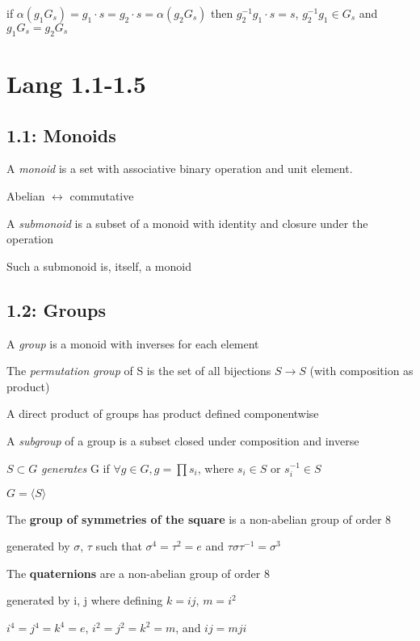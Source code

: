 \documentclass[12pt]{article}
\begin{document}
if $\alpha(g_1G_s) = g_1 \cdot s = g_2 \cdot s = \alpha(g_2G_s)$
then $g_2^{-1}g_1 \cdot s = s$, $g_2^{-1}g_1 \in G_s$ and $g_1G_s = g_2G_s$

\section{Lang 1.1-1.5}

\subsection{1.1: Monoids}

\noindent
A \textit{monoid} is a set with associative binary operation and unit element.

Abelian $\leftrightarrow$ commutative

\noindent
A \textit{submonoid} is a subset of a monoid with identity and closure under the operation

Such a submonoid is, itself, a monoid

\subsection{1.2: Groups}

\noindent
A \textit{group} is a monoid with inverses for each element

\noindent
The \textit{permutation group} of S is the set of all bijections $S \to S$ (with composition as product)

\noindent
A direct product of groups has product defined componentwise

\noindent
A \textit{subgroup} of a group is a subset closed under composition and inverse

\noindent
$S \subset G$ \textit{generates} G if $\forall g \in G, g = \prod s_i$, where $s_i \in S$ or $s_i^{-1} \in S$

$G = \langle S \rangle$

\noindent
The \textbf{group of symmetries of the square} is a non-abelian group of order 8

generated by $\sigma$, $\tau$ such that $\sigma^4 = \tau^2 = e$ and $\tau \sigma \tau^{-1} = \sigma^3$

\noindent
The \textbf{quaternions} are a non-abelian group of order 8

generated by i, j where defining $k = ij$, $m = i^2$

$i^4 = j^4 = k^4 = e$, $i^2 = j^2 = k^2 = m$, and $ij = mji$
\end{document}
